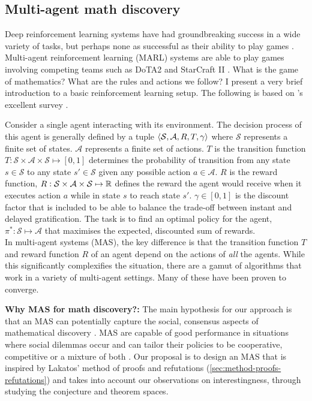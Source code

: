 \subsection{Multi-agent math discovery}
\label{subsec:MAS}
Deep reinforcement learning systems have had groundbreaking success in a wide variety of tasks, but perhaps none as successful as their ability to play games \cite{silverMasteringGameGo2016, RLgame_self_play}. Multi-agent reinforcement learning (MARL) systems are able to play games involving competing teams such as DoTA2 \cite{openai2018openaifive} and StarCraft II \cite{vinyals2019alphastar}. What is the game of mathematics? What are the rules and actions we follow? I present a very brief introduction to a basic reinforcement learning setup. The following is based on \citeauthor{hernandez-lealSurveyCritiqueMultiagent2019}'s excellent survey \cite{hernandez-lealSurveyCritiqueMultiagent2019}.
\par Consider a single agent interacting with its environment. The decision process of this agent is generally defined by a tuple $\braket{\mathcal{S, A}, R, T, \gamma}$ where $\mathcal{S}$ represents a finite set of states. $\mathcal{A}$ represents a finite set of actions. $T$ is the transition function $T:\mathcal{S}\times\mathcal{A}\times\mathcal{S}\mapsto[0, 1]$ determines the probability of transition from any state $s\in\mathcal{S}$ to any state $s'\in\mathcal{S}$ given any possible action $a\in\mathcal{A}$. $R$ is the reward function, $R:\mathcal{S}\times\mathcal{A}\times\mathcal{S}\mapsto\mathbb{R}$ defines the reward
the agent would receive when it executes action $a$ while in state $s$ to reach state $s'$. $\gamma\in[0, 1]$ is the discount factor that is included to be able to balance the trade-off between instant and delayed gratification. The task is to find an optimal policy for the agent, $\pi^*:\mathcal{S}\mapsto\mathcal{A}$ that maximises the expected, discounted sum of rewards.\\
In multi-agent systems (MAS), the key difference is that the transition function $T$ and reward function $R$ of an agent depend on the actions of \textit{all} the agents. While this significantly complexifies the situation, there are a gamut of algorithms that work in a variety of multi-agent settings. Many of these have been proven to converge. 
\par \textbf{Why MAS for math discovery?:} The main hypothesis for our approach is that an MAS can potentially capture the social, consensus aspects of mathematical discovery \cite{mathKnowledgeInterplayPractices2016}. MAS are capable of good performance in situations where social dilemmas occur and can tailor their policies to be cooperative, competitive or a mixture of both \cite{Tampuu2017, bansal2018emergent, todorov2012mujoco}. Our proposal is to design an MAS that is inspired by Lakatos' method of proofs and refutations (\ref{sec:method-proofs-refutations}) and takes into account our observations on interestingness, through studying the conjecture and theorem spaces. 
